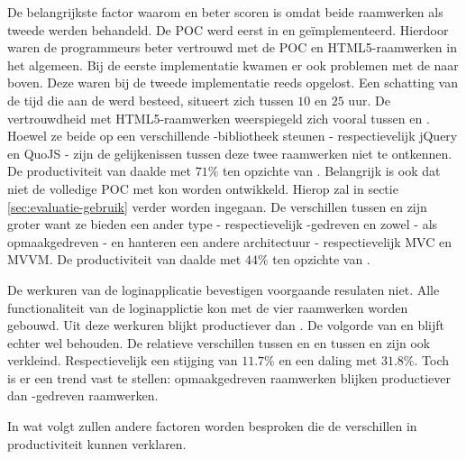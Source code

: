 
De belangrijkste factor waarom \lungo{} en \kendo{} beter scoren is omdat beide raamwerken als tweede werden behandeld.
De POC werd eerst in \jqm{} en \st{} geïmplementeerd.
Hierdoor waren de programmeurs beter vertrouwd met de POC en HTML5-raamwerken in het algemeen.
Bij de eerste implementatie kwamen er ook problemen met de  naar boven.
Deze waren bij de tweede implementatie reeds opgelost.
Een schatting van de tijd die aan de  werd besteed, situeert zich tussen $10$ en $25$ uur. %
De vertrouwdheid met HTML5-raamwerken weerspiegeld zich vooral tussen \jqm{} en \lungo{}.
Hoewel ze beide op een verschillende \js{}-bibliotheek steunen - respectievelijk jQuery en QuoJS - zijn de gelijkenissen tussen deze twee raamwerken niet te ontkennen.
De productiviteit van \lungo{} daalde met $71\%$ ten opzichte van \jqm{}.
Belangrijk is ook dat niet de volledige POC met \lungo{} kon worden ontwikkeld.
Hierop zal in sectie \ref{sec:evaluatie-gebruik} verder worden ingegaan.
De verschillen tussen \st{} en \kendo{} zijn groter want ze bieden een ander type - respectievelijk \js-gedreven en zowel \js- als opmaakgedreven - en hanteren een andere architectuur - respectievelijk MVC en MVVM.
De productiviteit van \kendo{} daalde met $44\%$ ten opzichte van \st{}.

De werkuren van de loginapplicatie bevestigen voorgaande resulaten niet.
Alle functionaliteit van de loginapplictie kon met de vier raamwerken worden gebouwd.
Uit deze werkuren blijkt \jqm{} productiever dan \lungo{}. 
De volgorde van \kendo{} en \st{} blijft echter wel behouden.
De relatieve verschillen tussen \jqm{} en \lungo{} en tussen \st{} en \kendo{} zijn ook verkleind.  
Respectievelijk een stijging van $11.7\%$ en een daling met $31.8\%$.
Toch is er een trend vast te stellen:  opmaakgedreven raamwerken blijken productiever dan \js-gedreven raamwerken.

In wat volgt zullen andere factoren worden besproken die de verschillen in productiviteit kunnen verklaren.

